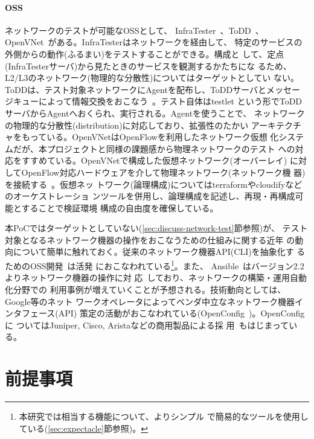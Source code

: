     \paragraph{OSS}
ネットワークのテストが可能なOSSとして、
InfraTester~\cite{infratester-github}、ToDD~\cite{todd-github}、
OpenVNet~\cite{openvnet-web}がある。InfraTesterはネットワークを経由して、
特定のサービスの外側からの動作(ふるまい)をテストすることができる。構成と
して、定点(InfraTesterサーバ)から見たときのサービスを観測するかたちにな
るため、L2/L3のネットワーク(物理的な分散性)についてはターゲットとしてい
ない。ToDDは、テスト対象ネットワークにAgentを配布し、ToDDサーバとメッセー
ジキューによって情報交換をおこなう~\cite{todd-blog}。テスト自体はtestlet
という形でToDDサーバからAgentへおくられ、実行される。Agentを使うことで、
ネットワークの物理的な分散性(distribution)に対応しており、拡張性のたかい
アーキテクチャをもっている。OpenVNetはOpenFlowを利用したネットワーク仮想
化システムだが、本プロジェクトと同様の課題感から物理ネットワークのテスト
への対応をすすめている。OpenVNetで構成した仮想ネットワーク(オーバーレイ)
に対してOpenFlow対応ハードウェアを介して物理ネットワーク(ネットワーク機
器)を接続する~\cite{openvnet-slide,network-testing-sdn-atmarkit}。仮想ネッ
トワーク(論理構成)についてはterraformやcloudifyなどのオーケストレーショ
ンツールを併用し、論理構成を記述し、再現・再構成可能とすることで検証環境
構成の自由度を確保している。

本PoCではターゲットとしていない(\ref{sec:discuss-network-test}節参照)が、
テスト対象となるネットワーク機器の操作をおこなうための仕組みに関する近年
の動向について簡単に触れておく。従来のネットワーク機器API(CLI)を抽象化す
るためのOSS開発~\cite{netmiko-github,trigger-github,napalm-github}は活発
におこなわれている\footnote{本研究では相当する機能について、よりシンプル
で簡易的なツールを使用している(\ref{sec:expectacle}節参照)。}。また、
Ansible~\cite{ansible-web}はバージョン2.2よりネットワーク機器の操作に対
応~\cite{ansible-22-news}しており、ネットワークの構築・運用自動化分野での
利用事例が増えていくことが予想される。技術動向としては、Google等のネット
ワークオペレータによってベンダ中立なネットワーク機器インタフェース(API)
策定の活動がおこなわれている(OpenConfig~\cite{openconfig})。OpenConfigに
ついてはJuniper, Cisco, Aristaなどの商用製品による採
用~\cite{openconfig-news}もはじまっている。

 \section{前提事項}
 \label{sec:premise}

